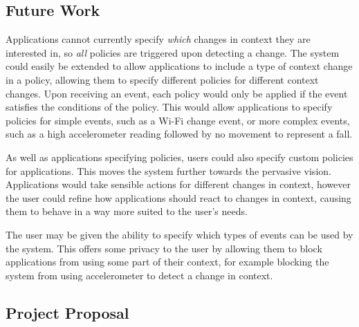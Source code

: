 \documentclass[12pt,twoside,notitlepage]{report}
\begin{document}
\section{Future Work}

Applications cannot currently specify {\sl which} changes in context they are interested in, so {\sl all} policies are triggered upon detecting a change.
The system could easily be extended to allow applications to include a type of context change in a policy, allowing them to specify different policies for different context changes. 
Upon receiving an event, each policy would only be applied if the event satisfies the conditions of the policy. 
This would allow applications to specify policies for simple events, such as a Wi-Fi change event, or more complex events, such as a high accelerometer reading followed by no movement to represent a fall. 

As well as applications specifying policies, users could also specify custom policies for applications. 
This moves the system further towards the pervasive vision. 
Applications would take sensible actions for different changes in context, however the user could refine how applications should react to changes in context, causing them to behave in a way more suited to the user's needs.

The user may be given the ability to specify which types of events can be used by the system. 
This offers some privacy to the user by allowing them to block applications from using some part of their context, for example blocking the system from using accelerometer to detect a change in context.

\cleardoublepage


\nocite{*}

\cleardoublepage

\begin{appendix}

\chapter{Project Proposal}



\end{appendix}
\end{document}
